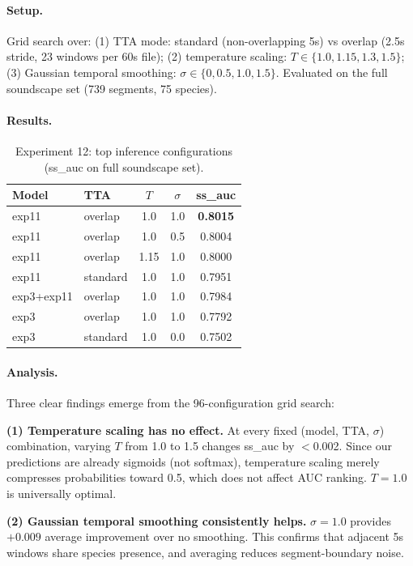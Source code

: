 \paragraph{Setup.}
Grid search over: (1) TTA mode: standard (non-overlapping 5s) vs overlap
(2.5s stride, 23 windows per 60s file); (2) temperature scaling:
$T \in \{1.0, 1.15, 1.3, 1.5\}$; (3) Gaussian temporal smoothing:
$\sigma \in \{0, 0.5, 1.0, 1.5\}$. Evaluated on the full soundscape set
(739 segments, 75 species).

\paragraph{Results.}
\begin{table}[h]
\centering
\caption{Experiment 12: top inference configurations (ss\_auc on full soundscape set).}
\label{tab:exp12}
\begin{tabular}{llccc}
\hline
\textbf{Model} & \textbf{TTA} & \textbf{$T$} & \textbf{$\sigma$} & \textbf{ss\_auc} \\
\hline
exp11 & overlap & 1.0 & 1.0 & \textbf{0.8015} \\
exp11 & overlap & 1.0 & 0.5 & 0.8004 \\
exp11 & overlap & 1.15 & 1.0 & 0.8000 \\
exp11 & standard & 1.0 & 1.0 & 0.7951 \\
exp3+exp11 & overlap & 1.0 & 1.0 & 0.7984 \\
exp3 & overlap & 1.0 & 1.0 & 0.7792 \\
exp3 & standard & 1.0 & 0.0 & 0.7502 \\
\hline
\end{tabular}
\end{table}

\paragraph{Analysis.}
Three clear findings emerge from the 96-configuration grid search:

\textbf{(1) Temperature scaling has no effect.}
At every fixed (model, TTA, $\sigma$) combination, varying $T$ from 1.0 to 1.5
changes ss\_auc by $<$0.002. Since our predictions are already sigmoids
(not softmax), temperature scaling merely compresses probabilities toward 0.5,
which does not affect AUC ranking. $T=1.0$ is universally optimal.

\textbf{(2) Gaussian temporal smoothing consistently helps.}
$\sigma=1.0$ provides $+0.009$ average improvement over no smoothing.
This confirms that adjacent 5s windows share species presence, and averaging
reduces segment-boundary noise.

